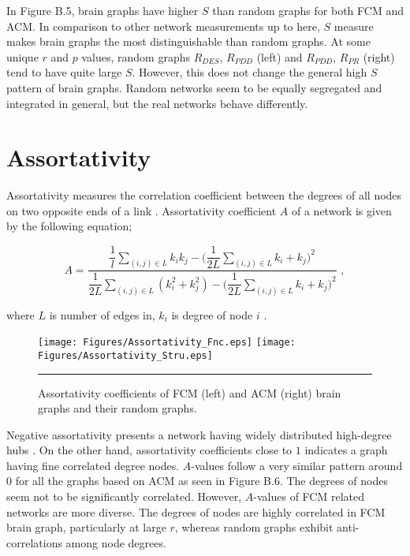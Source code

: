 In Figure B.5, brain graphs have higher $S$ than random graphs for both FCM and ACM. In comparison to other network measurements up to here, $S$ measure makes brain graphs the most distinguishable than random graphs. At some unique $r$ and $p$ values, random graphs $R_{DES}$, $R_{PDD}$ (left) and $R_{PDD}$, $R_{PR}$ (right) tend to have quite large $S$. However, this does not change the general high $S$ pattern of brain graphs. Random networks seem to be equally segregated and integrated in general, but the real networks behave differently. 



\section{Assortativity}

Assortativity measures the correlation coefficient between the degrees of all nodes on two opposite ends of a link \citep{RUB10}. Assortativity coefficient $A$ of a network is given by the following equation; 

\begin{equation}
A = \frac{\dfrac{1}{l} \sum\limits_{(i,j) \in L}  k_i k_j -  \Big ( \dfrac{1}{2L} \sum\limits_{(i,j) \in L}k_i + k_j  \Big )^2}{\dfrac{1}{2L}\sum\limits_{(i,j) \in L} ( k_i^2+  k_j^2) -\Big ( \dfrac{1}{2L} \sum\limits_{(i,j) \in L}k_i + k_j  \Big )^2 } \,\, ,
\end{equation}

where $L$ is number of edges in, $k_i$ is degree of node $i$ \citep{NEW02a}.


\begin{figure}[htbp]
 
  \centering
	 \texttt{[image: Figures/Assortativity\_Fnc.eps]}
	 \texttt{[image: Figures/Assortativity\_Stru.eps]}
    \rule{35em}{0.5pt}
  \caption[Assortativity]{Assortativity coefficients of FCM (left) and ACM (right) brain graphs and their random graphs.} 
    \label{fig:Assortativity}
 	
\end{figure}

Negative assortativity presents a network having widely distributed high-degree hubs \citep{RUB10}. On the other hand, assortativity coefficients close to $1$ indicates a graph having fine correlated degree nodes. $A$-values follow a very similar pattern around 0 for all the graphs based on ACM as seen in Figure B.6. The degrees of nodes seem not to be significantly correlated. However, $A$-values of FCM related networks are more diverse. The degrees of nodes are highly correlated in FCM brain graph, particularly at large $r$, whereas random graphs exhibit anti-correlations among node degrees.   

